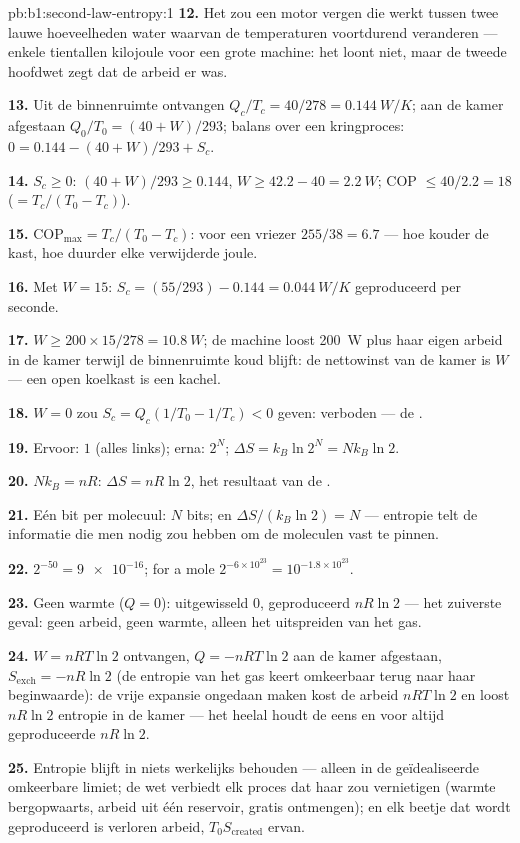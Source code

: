 \begin{solution}{pb:b1:second-law-entropy:1}
\textbf{12.} Het zou een motor vergen die werkt tussen twee lauwe
hoeveelheden water waarvan de temperaturen voortdurend veranderen --- enkele tientallen
kilojoule voor een grote machine: het loont niet, maar de tweede hoofdwet zegt
dat de arbeid er was.

\textbf{13.} Uit de binnenruimte ontvangen $Q_c/T_c = 40/278 = \qty{0.144}{W/K}$;
aan de kamer afgestaan $Q_0/T_0 = (40 + W)/293$; balans over een kringproces:
$0 = 0.144 - (40 + W)/293 + S_c$.

\textbf{14.} $S_c \geq 0$: $(40 + W)/293 \geq 0.144$, $W \geq 42.2 - 40 =
\qty{2.2}{W}$; COP $\leq 40/2.2 = 18$ ($= T_c/(T_0 - T_c)$).

\textbf{15.} $\mathrm{COP}_{\max} = T_c/(T_0 - T_c)$: voor een vriezer $255/38 = 6.7$
--- hoe kouder de kast, hoe duurder elke verwijderde joule.

\textbf{16.} Met $W = 15$: $S_c = (55/293) - 0.144 = \qty{0.044}{W/K}$ geproduceerd
per seconde.

\textbf{17.} $W \geq 200 \times 15/278 = \qty{10.8}{W}$; de machine loost
\qty{200}{W} plus haar eigen arbeid in de kamer terwijl de binnenruimte koud
blijft: de nettowinst van de kamer is $W$ --- een open koelkast is een kachel.

\textbf{18.} $W = 0$ zou $S_c = Q_c(1/T_0 - 1/T_c) < 0$ geven: verboden ---
de .

\textbf{19.} Ervoor: $1$ (alles links); erna: $2^N$; $\Delta S = k_B\ln2^N =
Nk_B\ln2$.

\textbf{20.} $Nk_B = nR$: $\Delta S = nR\ln2$, het resultaat van de .

\textbf{21.} Eén bit per molecuul: $N$ bits; en $\Delta S/(k_B\ln2) = N$ ---
entropie telt de informatie die men nodig zou hebben om de moleculen vast te
pinnen.

\textbf{22.} $2^{-50} = \num{9e-16}$; for a mole $2^{-6\times10^{23}} =
10^{-1.8\times10^{23}}$.

\textbf{23.} Geen warmte ($Q = 0$): uitgewisseld $0$, geproduceerd $nR\ln2$ --- het
zuiverste geval: geen arbeid, geen warmte, alleen het uitspreiden van het gas.

\textbf{24.} $W = nRT\ln2$ ontvangen, $Q = -nRT\ln2$ aan de kamer afgestaan,
$S_{\mathrm{exch}} = -nR\ln2$ (de entropie van het gas keert omkeerbaar terug naar
haar beginwaarde): de vrije expansie ongedaan maken kost de arbeid $nRT\ln2$
en loost $nR\ln2$ entropie in de kamer --- het heelal houdt de
eens en voor altijd geproduceerde $nR\ln2$.

\textbf{25.} Entropie blijft in niets werkelijks behouden --- alleen in de
geïdealiseerde omkeerbare limiet; de wet verbiedt elk proces dat haar zou
vernietigen (warmte bergopwaarts, arbeid uit één reservoir, gratis ontmengen);
en elk beetje dat wordt geproduceerd is verloren arbeid, $T_0S_{\mathrm{created}}$ ervan.
\end{solution}
